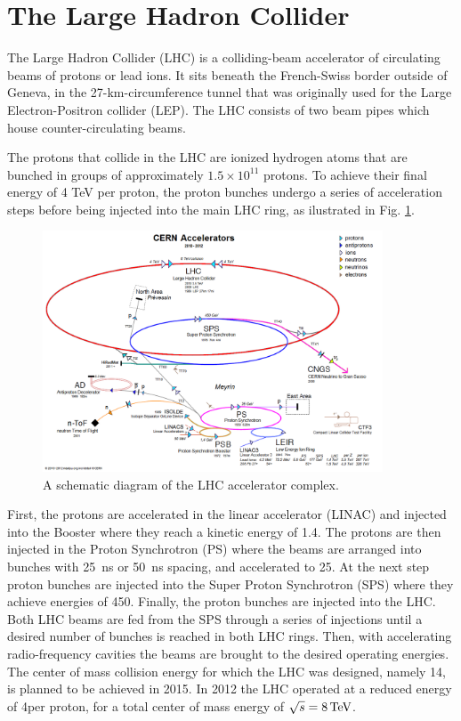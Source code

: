 \section{The Large Hadron Collider}

The Large Hadron Collider (LHC) \cite{Evans:2008zzb,Bruning:2004ej} is a colliding-beam accelerator 
of circulating beams of protons
or lead ions. 
It sits beneath the French-Swiss border outside of Geneva, in the 27-km-circumference tunnel that was originally used
for the Large Electron-Positron collider (LEP). 
 The LHC consists of two beam pipes which house counter-circulating beams.

The protons that collide in the LHC are ionized hydrogen atoms that are bunched in groups
of approximately $1.5\times10^{11}$ protons. To achieve their final energy of 4 TeV per proton,
the proton bunches undergo a series of acceleration steps before being injected into
the main LHC ring, as ilustrated in Fig. \ref{fig:accelerators}.

\begin{figure}[htbp]
\centering
\includegraphics[width=0.9\textwidth]{plots/intro/accelerators.png}
\caption{A schematic diagram of the LHC accelerator complex.\label{fig:accelerators}}
\end{figure}

First, the protons are accelerated in the linear accelerator (LINAC) and injected into 
the Booster where they reach a kinetic energy of 1.4\GeV. The protons are then injected
in the Proton Synchrotron (PS) where the beams are arranged into bunches
with 25~ns or 50~ns spacing, and accelerated to 25\GeV. At the next step
 proton bunches are injected
into the Super Proton Synchrotron (SPS) where they achieve energies of 450\GeV. Finally, the proton
bunches are injected into the LHC. Both LHC beams are fed from the SPS through a series of injections
until a desired number of bunches is reached in both LHC rings. Then, with accelerating 
radio-frequency cavities the beams are brought to the desired operating energies.
The center of mass collision energy for which the LHC was designed, namely 14\TeV,
 is planned to be achieved in 2015.
In 2012 the LHC operated at a reduced energy of 4\TeV per proton, for a total
center of mass energy of $\sqrt{s} = 8 \,\text{Te\hspace{-.08em}V}$.

